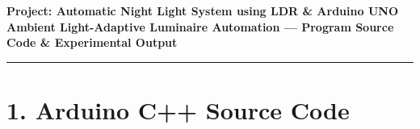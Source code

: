 \documentclass[10pt,a4paper]{article}
\begin{document}
\begin{center}
    {\large\bfseries Project: Automatic Night Light System using LDR \& Arduino UNO}\\[0.05cm]
    {\small\textbf{Ambient Light-Adaptive Luminaire Automation --- Program Source Code \& Experimental Output}}
\end{center}
\vspace{-0.22cm}
\rule{\textwidth}{0.9pt}
\vspace{0.02cm}

\section*{1. Arduino C++ Source Code}
\end{document}
